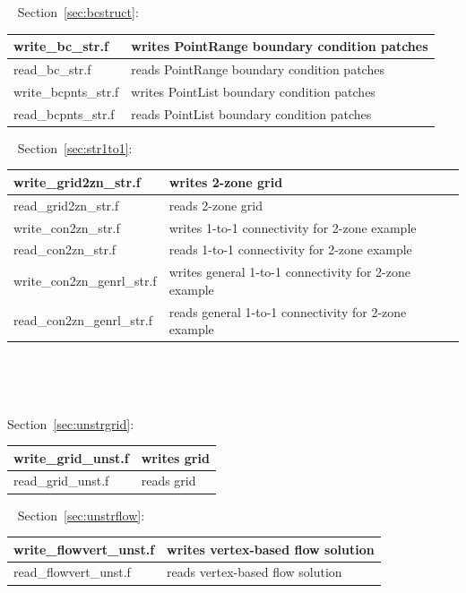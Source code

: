 \documentclass[12pt]{article}
\begin{document}
~\newline
Section~\ref{sec:bcstruct}:

\begin{tabular}{ | l | l | }
\hline
write\_bc\_str.f           & writes PointRange boundary condition patches \\ \hline
read\_bc\_str.f            & reads PointRange boundary condition patches \\ \hline
write\_bcpnts\_str.f       & writes PointList boundary condition patches \\ \hline
read\_bcpnts\_str.f        & reads PointList boundary condition patches \\ \hline
\end{tabular}

~\newline
Section~\ref{sec:str1to1}:

\begin{tabular}{ | l | l | }
\hline
write\_grid2zn\_str.f      & writes 2-zone grid \\ \hline
read\_grid2zn\_str.f       & reads 2-zone grid \\ \hline
write\_con2zn\_str.f       & writes 1-to-1 connectivity for 2-zone example \\ \hline
read\_con2zn\_str.f        & reads 1-to-1 connectivity for 2-zone example \\ \hline
write\_con2zn\_genrl\_str.f & writes general 1-to-1 connectivity for 2-zone example \\ \hline
read\_con2zn\_genrl\_str.f  & reads general 1-to-1 connectivity for 2-zone example \\ \hline
\end{tabular}

~\newline

~\newline
{}

\noindent Section~\ref{sec:unstrgrid}:

\begin{tabular}{ | l | l | }
\hline
write\_grid\_unst.f        & writes grid \\ \hline
read\_grid\_unst.f         & reads grid \\ \hline
\end{tabular}

~\newline
Section~\ref{sec:unstrflow}:

\begin{tabular}{ | l | l | }
\hline
write\_flowvert\_unst.f    & writes vertex-based flow solution \\ \hline
read\_flowvert\_unst.f     & reads vertex-based flow solution \\ \hline
\end{tabular}
\end{document}
